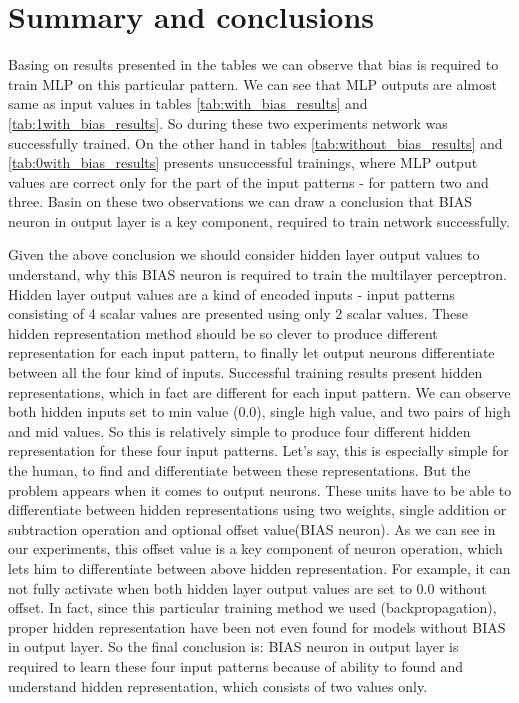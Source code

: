 \documentclass{classrep}
\begin{document}
    \section{Summary and conclusions} \label{summary} {
        Basing on results presented in the tables we can observe that bias is required to train MLP
        on this particular pattern. We can see that MLP outputs are almost same as input values in
        tables \ref{tab:with_bias_results} and \ref{tab:1with_bias_results}. So during these two
        experiments network was successfully trained. On the other hand in tables
        \ref{tab:without_bias_results} and \ref{tab:0with_bias_results} presents unsuccessful
        trainings, where MLP output values are correct only for the part of the input patterns - for
        pattern two and three. Basin on these two observations we can draw a conclusion that BIAS
        neuron in output layer is a key component, required to train network successfully.

        Given the above conclusion we should consider hidden layer output values to understand, why
        this BIAS neuron is required to train the multilayer perceptron. Hidden layer output values
        are a kind of encoded inputs - input patterns consisting of 4 scalar values  are presented
        using only 2 scalar values. These hidden representation method should be so clever to
        produce different representation for each input pattern, to finally let output neurons
        differentiate between all the four kind of inputs. Successful training results present
        hidden representations, which in fact are different for each input pattern. We can observe
        both hidden inputs set to min value (0.0), single high value, and two pairs of high and mid
        values.  So this is relatively simple to produce four different hidden representation for
        these four input patterns. Let's say, this is especially simple for the human, to find and
        differentiate between these representations. But the problem appears when it comes to output
        neurons. These units have to be able to differentiate between hidden representations using
        two weights, single addition or subtraction operation and optional offset value(BIAS
        neuron). As we can see in our experiments, this offset value is a key component of neuron
        operation, which lets him to differentiate between above hidden representation. For example,
        it can not fully activate when both hidden layer output values are set to 0.0 without
        offset. In fact, since this particular training method we used (backpropagation), proper
        hidden representation have been not even found for models without BIAS in output layer. So
        the final conclusion is: BIAS neuron in output layer is required to learn these four input
        patterns because of ability to found and understand hidden representation, which consists of
        two values only.
    }

    \begin{thebibliography}{0}
    \end{thebibliography}
\end{document}

